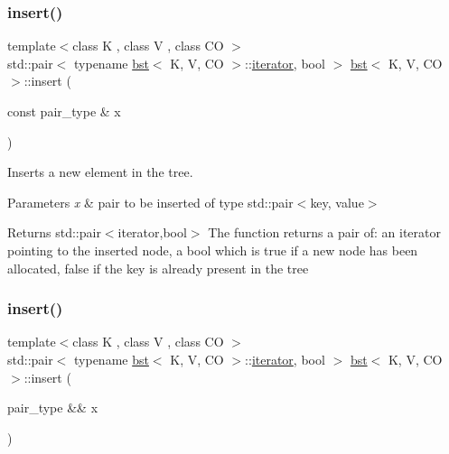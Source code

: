 \subsubsection{\texorpdfstring{insert()}{insert()}\hspace{0.1cm}{\footnotesize\ttfamily [1/2]}}
{\footnotesize\ttfamily template$<$class K , class V , class CO $>$ \\
std\+::pair$<$ typename \hyperlink{classbst}{bst}$<$ K, V, CO $>$\+::\hyperlink{classbst_a9378fa7f3f48ee62f3a0b4d168d8d98b}{iterator}, bool $>$ \hyperlink{classbst}{bst}$<$ K, V, CO $>$\+::insert (\begin{DoxyParamCaption}\item[{const pair\+\_\+type \&}]{x }\end{DoxyParamCaption})}



Inserts a new element in the tree. 


\begin{DoxyParams}{Parameters}
{\em x} & pair to be inserted of type std\+::pair$<$key, value$>$ \\
\hline
\end{DoxyParams}
\begin{DoxyReturn}{Returns}
std\+::pair$<$iterator,bool$>$ The function returns a pair of\+: an iterator pointing to the inserted node, a bool which is true if a new node has been allocated, false if the key is already present in the tree 
\end{DoxyReturn}
\mbox{\label{classbst_aed4d2cf32e33be72fbe1c7887c215f88}} 
\subsubsection{\texorpdfstring{insert()}{insert()}\hspace{0.1cm}{\footnotesize\ttfamily [2/2]}}
{\footnotesize\ttfamily template$<$class K , class V , class CO $>$ \\
std\+::pair$<$ typename \hyperlink{classbst}{bst}$<$ K, V, CO $>$\+::\hyperlink{classbst_a9378fa7f3f48ee62f3a0b4d168d8d98b}{iterator}, bool $>$ \hyperlink{classbst}{bst}$<$ K, V, CO $>$\+::insert (\begin{DoxyParamCaption}\item[{pair\+\_\+type \&\&}]{x }\end{DoxyParamCaption})}



